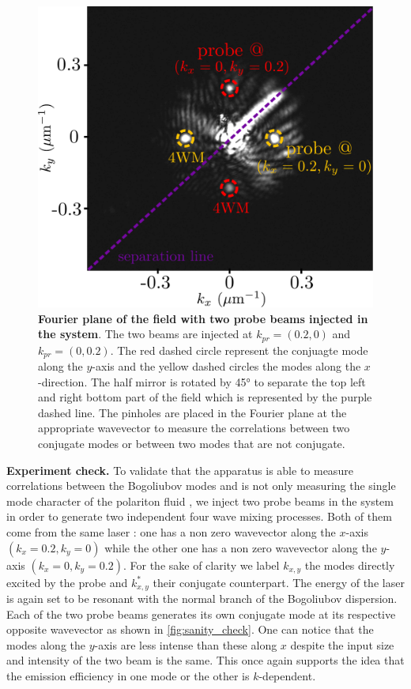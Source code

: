 \begin{figure}
    \centering
    \includegraphics[width=1\textwidth]{chap_correlation/fig/mosaic_4wm.pdf}
    \caption{\textbf{Fourier plane of the field with two probe beams injected in the system}. The two beams are injected at $k_{pr}=(0.2,0)$ and $k_{pr}=(0,0.2)$. The red dashed circle represent the conjuagte mode along the $y$-axis and the yellow dashed circles the modes along the $x$-direction. The half mirror is rotated by 45° to separate the top left and right bottom part of the field
    which is represented by the purple dashed line. The pinholes are placed in the Fourier plane at the appropriate wavevector to measure the correlations between two conjugate modes or between two modes that are not conjugate.}
    \label{fig:sanity_check}
\end{figure}

\bigskip

\indent \textbf{Experiment check.} To validate that the apparatus is able to measure correlations between the Bogoliubov modes and is not only measuring the single mode character of the polariton fluid \cite{a_baas_quantum_degeneracy2006}, we inject two probe beams in the system in order to generate two independent 
four wave mixing processes. Both of them come from the same laser : one has a non zero wavevector along the $x$-axis $(k_x=0.2, k_y=0)$ while the other one has a non zero wavevector along the $y$-axis $(k_x=0, k_y=0.2)$. For the sake of clarity we label $k_{x,y}$ the modes directly excited by the probe and $k_{x,y}^*$ their conjugate counterpart. The energy of the laser is again set to be resonant with the normal branch of the Bogoliubov dispersion.
Each of the two probe beams generates its own conjugate mode at its respective opposite wavevector as shown in \autoref{fig:sanity_check}. 
One can notice that the modes along the $y$-axis are less intense than these along $x$ despite the input size and intensity of the two beam is the same. This once again supports the idea that the emission efficiency in one mode or the other is $k$-dependent. 

